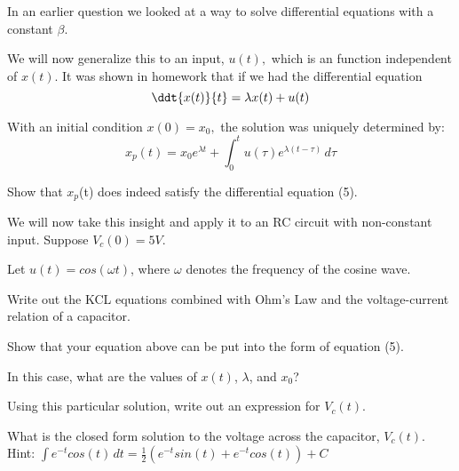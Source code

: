 
In an earlier question we looked at a way to solve differential equations with a constant $\beta.$
\par

We will now generalize this to an input, $u(t),$ which is an function independent of $x(t)$.
It was shown in homework that if we had the differential equation
\begin{equation}
\ddt{x(t)}{t} = \lambda x(t) + u(t)
\end{equation}

With an initial condition $x(0) = x_0,$ the solution was uniquely determined by:
\begin{equation}
    x_{p}(t) = x_{0}e^{\lambda{}t} + \int_0^t \! u(\tau{})e^{\lambda{}(t - \tau{})} \, d\tau{}
\end{equation}

\begin{enumerate}

\qitem Show that $x_{p}$(t) does indeed satisfy the differential equation (5).

\end{enumerate}

We will now take this insight and apply it to an RC circuit with non-constant input. Suppose $V_{c}(0) = 5V$.

\begin{figure}[H]
 
\end{figure}
Let $u(t) = cos(\omega{}t)$, where $\omega{}$ denotes the frequency of the cosine wave.

\begin{enumerate}[resume]

\qitem Write out the KCL equations combined with Ohm's Law and the voltage-current relation of a capacitor.

\sol{

}

\qitem Show that your equation above can be put into the form of equation (5).

\sol{

}

\qitem In this case, what are the values of $x(t)$, $\lambda{}$, and $x_{0}$?

\sol{

}

\qitem Using this particular solution, write out an expression for $V_{c}(t)$.

\sol{

}

\qitem What is the closed form solution to the voltage across the capacitor, $V_{c}(t)$.\\
Hint: $\int \! e^{-t}cos(t) \, dt = \frac{1}{2}(e^{-t}sin(t) + e^{-t}cos(t)) + C$

\sol{

}

\end{enumerate}
